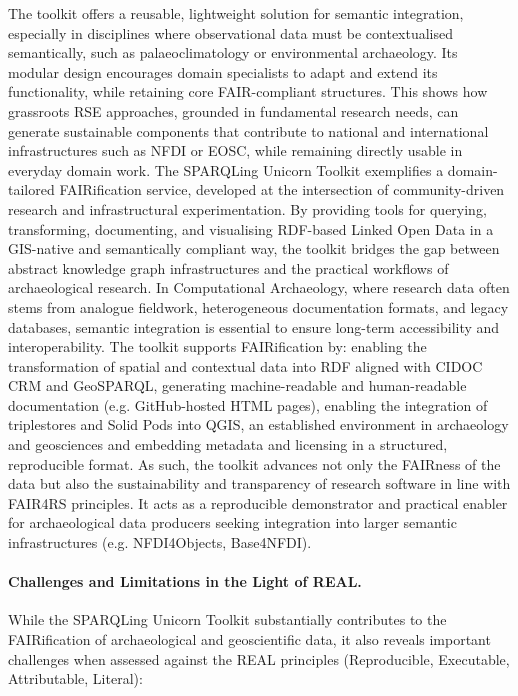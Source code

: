 \documentclass{eceasst}
\begin{document}
The toolkit offers a reusable, lightweight solution for semantic integration, especially in disciplines where observational data must be contextualised semantically, such as palaeoclimatology or environmental archaeology. Its modular design encourages domain specialists to adapt and extend its functionality, while retaining core FAIR-compliant structures. This shows how grassroots RSE approaches, grounded in fundamental research needs, can generate sustainable components that contribute to national and international infrastructures such as NFDI or EOSC, while remaining directly usable in everyday domain work. The SPARQLing Unicorn Toolkit exemplifies a domain-tailored FAIRification service, developed at the intersection of community-driven research and infrastructural experimentation. By providing tools for querying, transforming, documenting, and visualising RDF-based Linked Open Data in a GIS-native and semantically compliant way, the toolkit bridges the gap between abstract knowledge graph infrastructures and the practical workflows of archaeological research. In Computational Archaeology, where research data often stems from analogue fieldwork, heterogeneous documentation formats, and legacy databases, semantic integration is essential to ensure long-term accessibility and interoperability. The toolkit supports FAIRification by: enabling the transformation of spatial and contextual data into RDF aligned with CIDOC CRM and GeoSPARQL, generating machine-readable and human-readable documentation (e.g. GitHub-hosted HTML pages), enabling the integration of triplestores and Solid Pods into QGIS, an established environment in archaeology and geosciences and embedding metadata and licensing in a structured, reproducible format. As such, the toolkit advances not only the FAIRness of the data but also the sustainability and transparency of research software in line with FAIR4RS principles. It acts as a reproducible demonstrator and practical enabler for archaeological data producers seeking integration into larger semantic infrastructures (e.g. NFDI4Objects, Base4NFDI).

\paragraph{Challenges and Limitations in the Light of REAL.} While the SPARQLing Unicorn Toolkit substantially contributes to the FAIRification of archaeological and geoscientific data, it also reveals important challenges when assessed against the REAL principles (Reproducible, Executable, Attributable, Literal):
\end{document}
